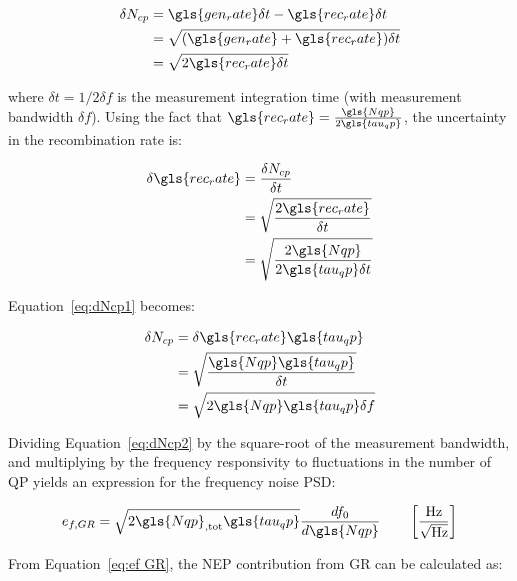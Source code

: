 \begin{equation}\label{eq:dNcp1}
  \begin{aligned}
  \delta N_{cp} &= \gls{gen_rate}\delta t - \gls{rec_rate}\delta t \\
                &= \sqrt{(\gls{gen_rate} + \gls{rec_rate})\delta t} \\
                &= \sqrt{2\gls{rec_rate}\delta t}
  \end{aligned}
\end{equation}

where $\delta t = 1/2 \delta f$ is the measurement integration time (with measurement bandwidth $\delta f$). Using the fact that $\gls{rec_rate} = \frac{\gls{Nqp}}{2\gls{tau_qp}}$, the uncertainty in the recombination rate is:

\begin{equation}
  \begin{aligned}
  \delta \gls{rec_rate} &= \frac{\delta N_{cp}}{\delta t} \\
                        &= \sqrt{ \frac{2\gls{rec_rate}}{\delta t}} \\
                        &= \sqrt{ \frac{2\gls{Nqp}}{2\gls{tau_qp}\delta t} }
  \end{aligned}
\end{equation}

Equation~\ref{eq:dNcp1} becomes:

\begin{equation}\label{eq:dNcp2}
  \begin{aligned}
  \delta N_{cp} &= \delta \gls{rec_rate} \gls{tau_qp} \\
                &= \sqrt{ \frac{\gls{Nqp} \gls{tau_qp}}{\delta t} } \\
                &= \sqrt{2\gls{Nqp}\gls{tau_qp} \delta f}
  \end{aligned}
\end{equation}

Dividing Equation~\ref{eq:dNcp2} by the square-root of the measurement bandwidth, and multiplying by the frequency responsivity to fluctuations in the number of QP yields an expression for the frequency noise PSD:

\begin{equation} \label{eq:ef GR}
e_{f,GR} = \sqrt{2 \gls{Nqp}_{\mathrm{,tot}}\gls{tau_qp}}\frac{df_{0}}{d\gls{Nqp}}
\qquad \left[ \frac{\mathrm{Hz}}{\sqrt{\mathrm{Hz}}} \right]
\end{equation}

From Equation~\ref{eq:ef GR}, the NEP contribution from GR can be calculated as:

